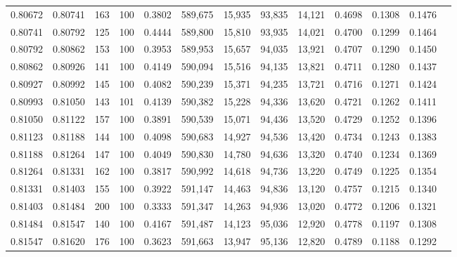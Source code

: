 \begin{tabular}{rrrrrrrrrrrrr}
0.80672 & 0.80741 &   163 & 100 &                                     0.3802 & 589,675 &  15,935 &  93,835 &  14,121 & 0.4698 & 0.1308 & 0.1476 \\
0.80741 & 0.80792 &   125 & 100 &                                     0.4444 & 589,800 &  15,810 &  93,935 &  14,021 & 0.4700 & 0.1299 & 0.1464 \\
0.80792 & 0.80862 &   153 & 100 &                                     0.3953 & 589,953 &  15,657 &  94,035 &  13,921 & 0.4707 & 0.1290 & 0.1450 \\
0.80862 & 0.80926 &   141 & 100 &                                     0.4149 & 590,094 &  15,516 &  94,135 &  13,821 & 0.4711 & 0.1280 & 0.1437 \\
0.80927 & 0.80992 &   145 & 100 &                                     0.4082 & 590,239 &  15,371 &  94,235 &  13,721 & 0.4716 & 0.1271 & 0.1424 \\
0.80993 & 0.81050 &   143 & 101 &                                     0.4139 & 590,382 &  15,228 &  94,336 &  13,620 & 0.4721 & 0.1262 & 0.1411 \\
0.81050 & 0.81122 &   157 & 100 &                                     0.3891 & 590,539 &  15,071 &  94,436 &  13,520 & 0.4729 & 0.1252 & 0.1396 \\
0.81123 & 0.81188 &   144 & 100 &                                     0.4098 & 590,683 &  14,927 &  94,536 &  13,420 & 0.4734 & 0.1243 & 0.1383 \\
0.81188 & 0.81264 &   147 & 100 &                                     0.4049 & 590,830 &  14,780 &  94,636 &  13,320 & 0.4740 & 0.1234 & 0.1369 \\
0.81264 & 0.81331 &   162 & 100 &                                     0.3817 & 590,992 &  14,618 &  94,736 &  13,220 & 0.4749 & 0.1225 & 0.1354 \\
0.81331 & 0.81403 &   155 & 100 &                                     0.3922 & 591,147 &  14,463 &  94,836 &  13,120 & 0.4757 & 0.1215 & 0.1340 \\
0.81403 & 0.81484 &   200 & 100 &                                     0.3333 & 591,347 &  14,263 &  94,936 &  13,020 & 0.4772 & 0.1206 & 0.1321 \\
0.81484 & 0.81547 &   140 & 100 &                                     0.4167 & 591,487 &  14,123 &  95,036 &  12,920 & 0.4778 & 0.1197 & 0.1308 \\
0.81547 & 0.81620 &   176 & 100 &                                     0.3623 & 591,663 &  13,947 &  95,136 &  12,820 & 0.4789 & 0.1188 & 0.1292 \\

\end{tabular}
